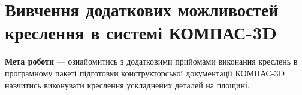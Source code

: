 \newpage\BorderFirstPage
\chapter[~]{Вивчення додаткових можливостей креслення в системі КОМПАС-3D}

\textbf{Мета роботи} --- ознайомитись з додатковими прийомами виконання креслень в програмному
пакеті підготовки конструкторської документації КОМПАС-3D, навчитись виконувати креслення
ускладнених деталей на площині.
